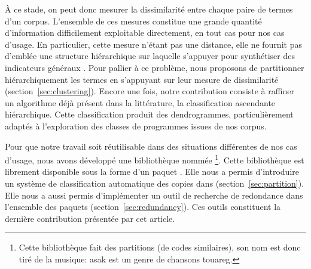 À ce stade, on peut donc mesurer la dissimilarité  entre chaque paire de termes
d'un corpus. L'ensemble de ces mesures constitue une grande quantité
d'information difficilement exploitable directement, en tout cas pour
nos cas d'usage. En particulier, cette mesure n'étant pas une
distance, elle ne fournit pas d'emblée une structure hiérarchique sur
laquelle s'appuyer pour synthétiser des indicateurs généraux . Pour
pallier à ce problème, nous proposons de partitionner hiérarchiquement
les termes en s'appuyant sur leur mesure de dissimilarité
(section~\ref{sec:clustering}). Encore une fois, notre contribution
consiste à raffiner un algorithme déjà présent dans la littérature, la
classification ascendante hiérarchique. Cette classification produit
des dendrogrammes, particulièrement adaptés à l'exploration des
classes de programmes issues de nos corpus.

Pour que notre travail soit réutilisable dans des situations
différentes de nos cas d'usage, nous avons développé une bibliothèque
nommée {\Asak}\footnote{Cette bibliothèque fait des partitions (de codes similaires), son nom est donc tiré de la musique: asak est un genre de chansons touareg.}.
Cette bibliothèque est librement disponible sous la forme d'un paquet {\Opam}.
Elle nous a permis d'introduire un système de classification automatique
des copies dans {\LearnOCaml} (section~\ref{sec:partition}). Elle nous a
aussi permis d'implémenter un outil de recherche de redondance dans
l'ensemble des paquets {\Opam} (section~\ref{sec:redundancy}). Ces outils
constituent la dernière contribution présentée par cet article.

